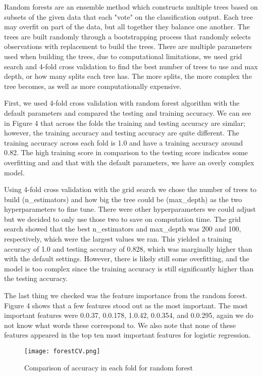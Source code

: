 \documentclass[12pt,letterpaper]{article}
\begin{document}
Random forests are an ensemble method which constructs multiple trees based on subsets of the given data that each "vote" on the classification output.  Each tree may overfit on part of the data, but all together they balance one another. The trees are built randomly through a bootstrapping process that randomly selects observations with replacement to build the trees. There are multiple parameters used when building the trees, due to computational limitations, we used grid search and 4-fold cross validation to find the best number of trees to use and max depth, or how many splits each tree has. The more splits, the more complex the tree becomes, as well as more computationally expensive.

First, we used 4-fold cross validation with random forest algorithm with the default parameters and compared the testing and training accuracy. We can see in Figure 4 that across the folds the training and testing accuracy are similar; however, the training accuracy and testing accuracy are quite different. The training accuracy across each fold is 1.0 and have a training accuracy around 0.82. The high training score in comparison to the testing score indicates some overfitting and and that with the default parameters, we have an overly complex model.

Using 4-fold cross validation with the grid search we chose the number of trees to build (n\_estimators) and how big the tree could be (max\_depth) as the two hyperparameters to fine tune. There were other hyperparameters we could adjust but we decided to only use those two to save on computation time. The grid search showed that the best n\_estimators and max\_depth was 200 and 100, respectively, which were the largest values we ran. This yielded a training accuracy of 1.0 and testing accuracy of 0.828, which was marginally higher than with the default settings. However, there is likely still some overfitting, and the model is too complex since the training accuracy is still significantly higher than the testing accuracy.

The last thing we checked was the feature importance from the random forest. Figure 4 shows that a few features stood out as the most important. The most important features were 0.0.37, 0.0.178, 1.0.42, 0.0.354, and 0.0.295, again we do not know what words these correspond to. We also note that none of these features appeared in the top ten most important features for logistic regression.

\begin{figure}[h]
	\centering
	\texttt{[image: forestCV.png]}
	\caption{Comparison of accuracy in each fold for  random forest}
\end{figure}
\end{document}
